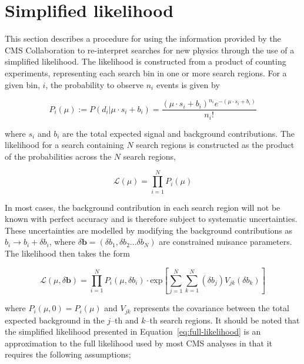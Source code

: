 \section{Simplified likelihood}
\label{sec:simplified-likelihood}

This section describes a procedure for using the information provided by the CMS Collaboration to 
re-interpret searches for new physics through the use of a simplified likelihood. The likelihood is 
constructed from a product of counting experiments, representing each search bin in one or more search regions. 
For a given bin, $i$, the probability to observe $n_{i}$ events is given by

\begin{equation}
 P_{i}(\mu) := P(d_{i}|\mu \cdot s_{i}+b_{i}) = \dfrac{(\mu \cdot s_{i}+b_{i})^{n_{i}} e^{-(\mu \cdot s_{i}+b_{i})} }{n_{i}!}
\label{eq:poisson-likelihood}
\end{equation}

where $s_{i}$ and $b_{i}$ are the total expected signal and background contributions. 
The likelihood for a search containing $N$ search regions is constructed as the product 
of the probabilities across the $N$ search regions, 

\begin{equation}
\mathcal{L}(\mu) = \prod_{i=1}^{N} P_{i}(\mu)
\label{eq:stat-likelihood}
\end{equation}

In most cases, the background contribution in each search region will not be known with perfect accuracy and is therefore 
subject to systematic uncertainties. These uncertainties are modelled by modifying the background contributions as 
$b_{i}\rightarrow b_{i}+\delta b_{i}$, where $\delta\mathbf{b}=(\delta b_{1},\delta b_{2}...\delta b_{N})$ are constrained nuisance parameters. The likelihood then takes the form

\begin{equation}
\mathcal{L}(\mu, \delta \mathbf{b}) = \prod_{i=1}^{N} P_{i}(\mu,\delta b_{i}) \cdot \mathrm{exp} \left[ \sum_{j=1}^{N}\sum_{k=1}^{N} (\delta b_{j}) V_{jk} (\delta b_{k}) \right]
\label{eq:full-likelihood}
\end{equation}

where $P_{i}(\mu,0)=P_{i}(\mu)$ and $V_{jk}$ represents the covariance between
the total expected background in the $j$--th and $k$--th search regions. It should be noted that 
the simplified likelihood presented in Equation~\ref{eq:full-likelihood} is an approximation to the full likelihood used 
by most CMS analyses in that it requires the following assumptions;

